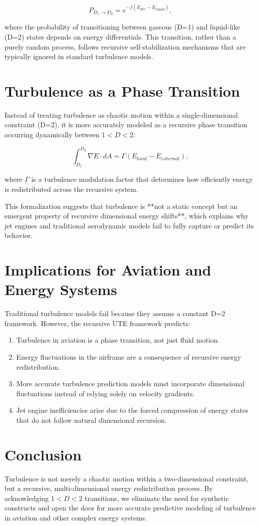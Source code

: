 \documentclass[letterpaper,12pt]{article}
\begin{document}
\begin{equation}
    P_{D_1 \to D_2} = e^{-\beta (E_{gas} - E_{liquid})},
\end{equation}

where the probability of transitioning between gaseous (D=1) and liquid-like (D=2) states depends on energy differentials. This transition, rather than a purely random process, follows recursive self-stabilization mechanisms that are typically ignored in standard turbulence models.

\section{Turbulence as a Phase Transition}
Instead of treating turbulence as chaotic motion within a single-dimensional constraint (D=2), it is more accurately modeled as a recursive phase transition occurring dynamically between $1 < D < 2$:

\begin{equation}
    \int_{D_1}^{D_2} \nabla E \cdot dA = \Gamma \left( E_{local} - E_{external} \right),
\end{equation}

where $\Gamma$ is a turbulence modulation factor that determines how efficiently energy is redistributed across the recursive system.

This formalization suggests that turbulence is **not a static concept but an emergent property of recursive dimensional energy shifts**, which explains why jet engines and traditional aerodynamic models fail to fully capture or predict its behavior.

\section{Implications for Aviation and Energy Systems}
Traditional turbulence models fail because they assume a constant D=2 framework. However, the recursive UTE framework predicts:

\begin{enumerate}
    \item Turbulence in aviation is a phase transition, not just fluid motion.
    \item Energy fluctuations in the airframe are a consequence of recursive energy redistribution.
    \item More accurate turbulence prediction models must incorporate dimensional fluctuations instead of relying solely on velocity gradients.
    \item Jet engine inefficiencies arise due to the forced compression of energy states that do not follow natural dimensional recursion.
\end{enumerate}

\section{Conclusion}
Turbulence is not merely a chaotic motion within a two-dimensional constraint, but a recursive, multi-dimensional energy redistribution process. By acknowledging $1 < D < 2$ transitions, we eliminate the need for synthetic constructs and open the door for more accurate predictive modeling of turbulence in aviation and other complex energy systems.
\end{document}
